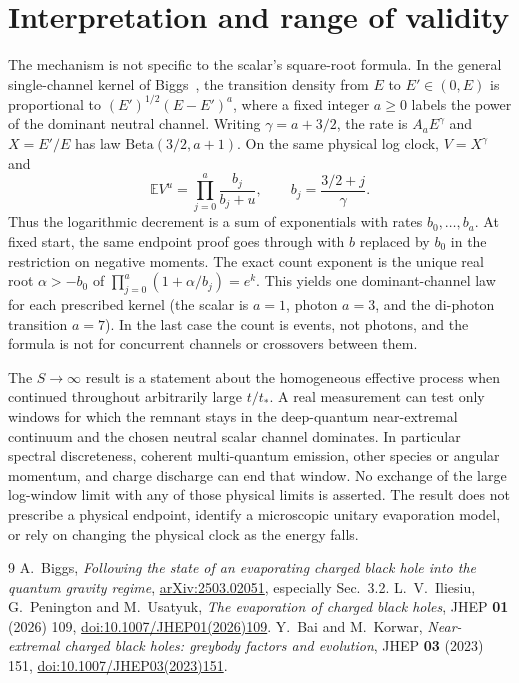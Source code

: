\documentclass[10pt]{article}
\newcommand{\E}{\mathbb E}
\begin{document}
\section{Interpretation and range of validity}
The mechanism is not specific to the scalar's square-root formula. In the general single-channel kernel of Biggs~\cite[Eq. (34)]{Biggs}, the transition density from $E$ to $E'\in(0,E)$ is proportional to $(E')^{1/2}(E-E')^a$, where a fixed integer $a\ge0$ labels the power of the dominant neutral channel. Writing $\gamma=a+3/2$, the rate is $A_a E^\gamma$ and $X=E'/E$ has law $\mathrm{Beta}(3/2,a+1)$. On the same physical log clock, $V=X^\gamma$ and
\[
\E V^u=\prod_{j=0}^a\frac{b_j}{b_j+u},\qquad b_j=\frac{3/2+j}{\gamma}.
\]
Thus the logarithmic decrement is a sum of exponentials with rates $b_0,\ldots,b_a$. At fixed start, the same endpoint proof goes through with $b$ replaced by $b_0$ in the restriction on negative moments. The exact count exponent is the unique real root $\alpha>-b_0$ of $\prod_{j=0}^a(1+\alpha/b_j)=e^k$. This yields one dominant-channel law for each prescribed kernel (the scalar is $a=1$, photon $a=3$, and the di-photon transition $a=7$). In the last case the count is events, not photons, and the formula is not for concurrent channels or crossovers between them.

The $S\to\infty$ result is a statement about the homogeneous effective process when continued throughout arbitrarily large $t/t_*$. A real measurement can test only windows for which the remnant stays in the deep-quantum near-extremal continuum and the chosen neutral scalar channel dominates. In particular spectral discreteness, coherent multi-quantum emission, other species or angular momentum, and charge discharge can end that window. No exchange of the large log-window limit with any of those physical limits is asserted. The result does not prescribe a physical endpoint, identify a microscopic unitary evaporation model, or rely on changing the physical clock as the energy falls.

\begin{thebibliography}{9}
A.~Biggs, \emph{Following the state of an evaporating charged black hole into the quantum gravity regime}, \href{https://arxiv.org/abs/2503.02051}{arXiv:2503.02051}, especially Sec.~3.2.
L.~V.~Iliesiu, G.~Penington and M.~Usatyuk, \emph{The evaporation of charged black holes}, JHEP \textbf{01} (2026) 109, \href{https://doi.org/10.1007/JHEP01(2026)109}{doi:10.1007/JHEP01(2026)109}.
Y.~Bai and M.~Korwar, \emph{Near-extremal charged black holes: greybody factors and evolution}, JHEP \textbf{03} (2023) 151, \href{https://doi.org/10.1007/JHEP03(2023)151}{doi:10.1007/JHEP03(2023)151}.
\end{thebibliography}
\end{document}
